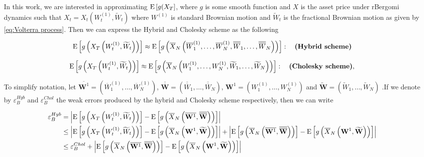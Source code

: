 In this work, we are interested in approximating $\mathrm{E}\left[g(X_T\right]$, where $g$ is some smooth function and $X$ is the asset price under rBergomi dynamics such that $X_t=X_t(W^{(1)}_t,\widetilde{W}_t)$ where $W^{(1)}$ is standard Brownian motion and  $\widetilde{W}_t$ is the fractional Brownian motion as given by \eqref{eq:Volterra process}.  Then we can express the Hybrid and Cholesky scheme as the following 

\begin{align}\label{eq: Hybrid approx}
\mathrm{E}\left[g\left(X_T\left(W^{(1)}_t,\widetilde{W}_t \right)\right)\right] \approx \mathrm{E}\left[g\left(\overline{X}_N\left(\overline{W}^{(1)}_1,\dots,\overline{W}^{(1)}_N, \overline{\overline{W}}_1, \dots,\overline{\overline{W}}_N\right)\right)\right]:\quad \textbf{(Hybrid  scheme)}
\end{align}


\begin{align}\label{eq: Cholesky approx}
\mathrm{E}\left[g\left(X_T\left(W^{(1)}_t,\widetilde{W}_t\right)\right)\right] \approx \mathrm{E}\left[g\left(\overline{X}_N\left(W^{(1)}_1,\dots,W^{(1)}_N, \widetilde{W}_1, \dots,\widetilde{W}_N\right)\right)\right]:\quad \textbf{(Cholesky  scheme)},
\end{align}

To simplify notation, let $\overline{\mathbf{W}^{1}}=(\overline{W}^{(1)}_1,\dots,\overline{W}^{(1)}_N)$, $\overline{\overline{\mathbf{W}}}=(\overline{\overline{W}}_1,\dots,\overline{\overline{W}}_N)$, $\mathbf{W}^{1}=(W^{(1)}_1,\dots,W^{(1)}_N)$ and $\widetilde{\mathbf{W}}=(\widetilde{W}_1,\dots,\widetilde{W}_N)$ .If we denote by $\varepsilon_{B}^{Hyb}$ and $\varepsilon_{B}^{Chol}$ the weak errors produced by the hybrid and Cholesky scheme respectively, then we can write
\begin{small}
\begin{align}\label{eq: Weak_error_hyb_chol}
\varepsilon_{B}^{Hyb}&=\left\lvert\mathrm{E}\left[g\left(X_T\left(W^{(1)}_t,\widetilde{W}_t\right) \right)\right]-\mathrm{E}\left[g\left(\overline{X}_N\left(\overline{\mathbf{W}^{1}}, \overline{\overline{\mathbf{W}}}\right) \right)\right]\right\rvert \nonumber\\
&\le \left\lvert\mathrm{E}\left[g\left(X_T\left(W^{(1)}_t,\widetilde{W}_t\right)\right)\right]-\mathrm{E}\left[g\left(\overline{X}_N\left(\mathbf{W}^{1}, \widetilde{\mathbf{W}}\right)\right)\right]\right\rvert+ \left\lvert \mathrm{E}\left[g\left(\overline{X}_N\left(\overline{\mathbf{W}^{1}}, \overline{\overline{\mathbf{W}}}\right)\right)\right]- \mathrm{E}\left[g\left(\overline{X}_N\left(\mathbf{W}^{1}, \widetilde{\mathbf{W}}\right)\right)\right]\right\rvert\nonumber\\
&\le \varepsilon_{B}^{Chol}+ \left\lvert \mathrm{E}\left[g\left(\overline{X}_N\left(\overline{\mathbf{W}^{1}}, \overline{\overline{\mathbf{W}}}\right)\right)\right]- \mathrm{E}\left[g\left(\overline{X}_N\left(\mathbf{W}^{1}, \widetilde{\mathbf{W}}\right)\right)\right]\right\rvert
\end{align}
\end{small}


